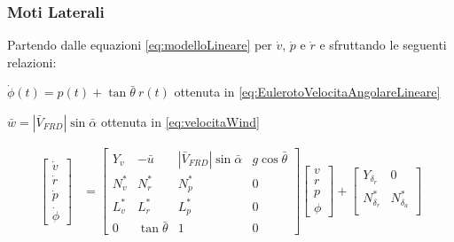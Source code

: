 \subsubsection{Moti Laterali}

Partendo dalle equazioni \eqref{eq:modelloLineare} per $\dot{v}$, $\dot{p}$ e $\dot{r}$ e sfruttando le seguenti relazioni:
\begin{sitemize}
    \item  $\dot{\phi}(t) = p(t) + \tan\bar{\theta}\:r(t)$ ottenuta in \eqref{eq:EulerotoVelocitaAngolareLineare}
    \item $\bar{w} = |\bar{V}_{FRD}|\sin\bar{\alpha}$ ottenuta in \eqref{eq:velocitaWind}
\end{sitemize}

\begin{equation*}
    \begin{split}
        \begin{bmatrix}
            \dot{v} \\
            \dot{r} \\
            \dot{p} \\
            \dot{\phi}
        \end{bmatrix} & = \begin{bmatrix}
                              Y_v   & -\bar{u}         & |\bar{V}_{FRD}|\sin\bar{\alpha} & g\cos\bar{\theta} \\
                              N_v^* & N_r^*            & N_p^*                           & 0                 \\
                              L_v^* & L_r^*            & L_p^*                           & 0                 \\
                              0     & \tan\bar{\theta} & 1                               & 0
                          \end{bmatrix} \begin{bmatrix}
                                            v \\
                                            r \\
                                            p \\
                                            \phi
                                        \end{bmatrix} + \begin{bmatrix}
                                                            Y_{\delta_r}   & 0              \\
                                                            N_{\delta_r}^* & N_{\delta_a}^* \\

\end{bmatrix}
\end{split}
\end{equation*}
